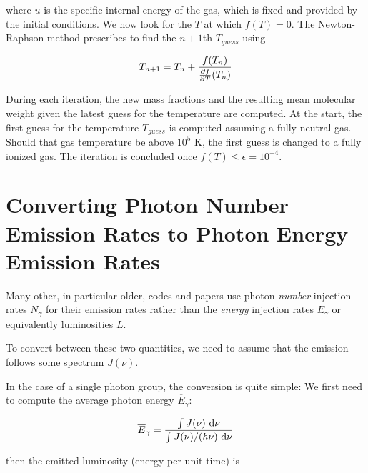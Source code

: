 where $u$ is the specific internal energy of the gas, which is fixed and provided by the initial
conditions. We now look for the $T$ at which $f(T) = 0$. The Newton-Raphson method prescribes to
find the $n+1$th $T_{guess}$ using

\begin{align}
    T_{n+1} = T_n + \frac{f(T_n)}{\frac{\partial f}{\partial T}(T_n)}
\end{align}

During each iteration, the new mass fractions and the resulting mean molecular weight given the
latest guess for the temperature are computed. At the start, the first guess for the temperature
$T_{guess}$ is computed assuming a fully neutral gas. Should that gas temperature be above $10^5$ K,
the first guess is changed to a fully ionized gas. The iteration is concluded once $f(T) \leq
\epsilon = 10^{-4}$.













\clearpage
\section{Converting Photon Number Emission Rates to Photon Energy Emission Rates}

Many other, in particular older, codes and papers use photon \emph{number} injection rates $\dot{N}_{\gamma}$ for their emission rates rather than the \emph{energy} injection rates $\dot{E}_\gamma$ or equivalently luminosities $L$.

To convert between these two quantities, we need to assume that the emission follows some spectrum $J(\nu)$.

In the case of a single photon group, the conversion is quite simple: We first need to compute the average photon energy $\overline{E}_\gamma$:

\begin{align*}
	\overline{E}_\gamma = \frac{\int J(\nu) \ \mathrm{d} \nu }{\int J(\nu) / (h \nu) \ \mathrm{d} \nu}
\end{align*}

then the emitted luminosity (energy per unit time) is

